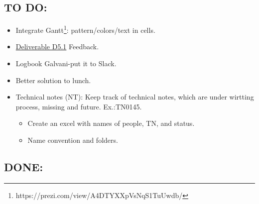 \subsection{TO DO:}
\begin{itemize}
   \item Integrate Gantt\footnote{https://prezi.com/view/A4DTYXXpVsNqS1TuUwdb/}: pattern/colors/text in cells.
    \item \href{https://www.dropbox.com/home/998%20-%20neurotwin.eu%20repository/05%20-%20Deliverables?preview=NEUROTWIN+Deliverable+-+D5.1+Quality+Guide_v1.6.docx}{Deliverable D5.1} Feedback.
    \item Logbook Galvani-put it to Slack.
    \item Better solution to lunch.
    \item Technical notes (NT): Keep track of technical notes, which are under wirtting process, missing and future. Ex.:TN0145.
    \begin{itemize}
        \item Create an excel with names of people, TN, and status.
        \item Name convention and folders.
    \end{itemize}

\end{itemize}

\subsection{DONE:}
